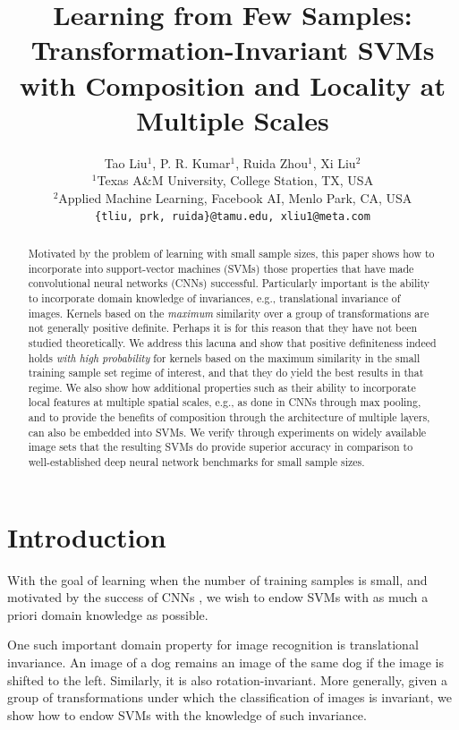 \documentclass{article}
\title{Learning from Few Samples: Transformation-Invariant SVMs with Composition and Locality at Multiple Scales}
\author{%
  Tao Liu$^1$, P. R. Kumar$^1$, Ruida Zhou$^1$, Xi Liu$^2$\\
  $^1$Texas A\&M University, College Station, TX, USA\\
  $^2$Applied Machine Learning, Facebook AI, Menlo Park, CA, USA\\
  \texttt{\{tliu, prk, ruida\}@tamu.edu, xliu1@meta.com} \\
}
\theoremstyle{plain}
\theoremstyle{definition}
\theoremstyle{remark}
\begin{document}
\maketitle


\begin{abstract}
Motivated by the problem of learning with small sample sizes, this paper shows how to incorporate into support-vector machines (SVMs) those properties that have made convolutional neural networks (CNNs) successful. Particularly important is the ability to incorporate domain knowledge of invariances, e.g., translational invariance of images. Kernels based on the \textit{maximum} similarity over a group of transformations are not generally positive definite. Perhaps it is for this reason that they have not been studied theoretically. We address this lacuna and show that positive definiteness indeed holds \textit{with high probability} for kernels based on the maximum similarity in the small training sample set regime of interest, and that they do yield the best results in that regime. We also show how additional properties such as their ability to incorporate local features at multiple spatial scales, e.g., as done in CNNs through max pooling, and to provide the benefits of composition through the architecture of multiple layers, can also be embedded into SVMs. We verify through experiments on widely available image sets that the resulting SVMs do provide superior accuracy in comparison to well-established deep neural network benchmarks for small sample sizes.
\end{abstract}



\section{Introduction}
With the goal of learning when the number of training samples is small, and motivated by the success of CNNs \cite{lecun1989generalization, tan2019efficientnet}, we wish to endow SVMs with as much a priori domain knowledge as possible. 

One such important domain property for image recognition is translational invariance. An image of a dog remains an image of the same dog if the image is shifted to the left. Similarly, it is also rotation-invariant. More generally, given a group of transformations under which the classification of images is invariant, we show how to endow SVMs with the knowledge of such invariance. 
\end{document}
